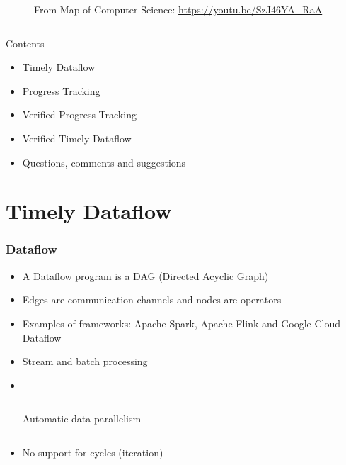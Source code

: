 \documentclass[aspectratio=169,10pt]{beamer}
\begin{document}
\begin{frame}[fragile]
\begin{columns}
\begin{column}{0.55\textwidth}
\begin{figure}
      \caption{From Map of Computer Science: \url{https://youtu.be/SzJ46YA_RaA}}
      \end{figure}
    \end{column}
  \end{columns}
\end{frame}

\begin{frame}{Contents}
  \begin{itemize}
    \item Timely Dataflow
    \item Progress Tracking
    \item Verified Progress Tracking
    \item Verified Timely Dataflow
    \item Questions, comments and suggestions
  \end{itemize}
\end{frame}

\section{Timely Dataflow}

\begin{frame}
  \frametitle{Dataflow}
  \begin{itemize}
    \item A Dataflow program is a DAG (Directed Acyclic Graph)
          \pause
    \item Edges are communication channels and nodes are operators
          \pause
    \item Examples of frameworks: Apache Spark, Apache Flink and Google Cloud Dataflow
          \pause
    \item Stream and batch processing
          \pause
    \item \  \begin{columns}
      \begin{column}{.4\textwidth}
        Automatic data parallelism
      \end{column}
      \begin{column}{.45\textwidth}
        \resizebox{0.85\textwidth}{!}
        {
          
        }
      \end{column}
    \end{columns}
          \pause
    \item No support for cycles (iteration)
  \end{itemize}
\end{frame}
\end{document}
